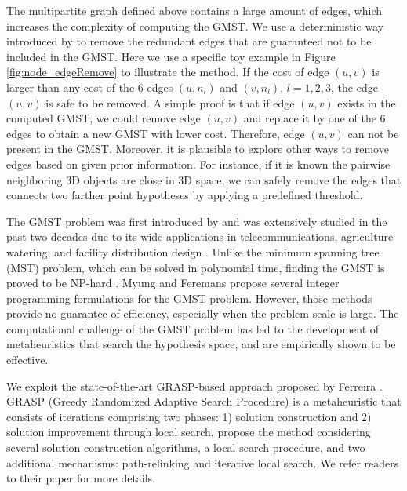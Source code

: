 The multipartite graph defined above contains a large amount of edges, which increases the complexity of computing the GMST.
We use a deterministic way introduced by \citet{Ferreira_ESWA2012} to remove the redundant edges that are guaranteed not to be included in the GMST. Here we use a specific toy example in Figure \ref{fig:node_edgeRemove} to illustrate the method. If the cost of edge $(u,v)$ is larger than any cost of the 6 edges $(u,n_l)$ and $(v,n_l)$, $l=1,2,3$, the edge $(u,v)$ is safe to be removed. A simple proof is that if edge $(u,v)$ exists in the computed GMST, we could remove edge $(u,v)$ and replace it by one of the 6 edges to obtain a new GMST with lower cost. Therefore, edge $(u,v)$ can not be present in the GMST. Moreover, it is plausible to explore other ways to remove edges based on given prior information. For instance, if it is known the pairwise neighboring 3D objects are close in 3D space, we can safely remove the edges that connects two farther point hypotheses by applying a predefined threshold.

The GMST problem was first introduced by \citet{MyungLT_95} and was extensively studied in the past two decades \cite{MyungLT_95,Dror_EJOR,Feremans_LL02,Oncan_CL08,Ferreira_ESWA2012} due to its wide applications in  telecommunications, agriculture watering, and facility distribution design \cite{MyungLT_95,Dror_EJOR}. Unlike the minimum spanning tree (MST) problem, which can be solved in polynomial time, finding the GMST is proved to be NP-hard \cite{MyungLT_95}. Myung \etal \cite{MyungLT_95} and Feremans \etal \cite{Feremans_LL02} propose several integer programming formulations for the GMST problem. However, those methods provide no guarantee of efficiency, especially when the problem scale is large. The computational challenge of the GMST problem has led to the development of metaheuristics \cite{Oncan_CL08,Ferreira_ESWA2012} that search the hypothesis space, and are empirically shown to be effective.

We exploit the state-of-the-art GRASP-based approach proposed by Ferreira \etal \cite{Ferreira_ESWA2012}. GRASP (Greedy Randomized Adaptive Search Procedure) is a metaheuristic that consists of iterations comprising two phases: 1) solution construction and 2) solution improvement through local search. \citet{Ferreira_ESWA2012} propose the method considering several solution construction algorithms, a local search procedure, and two additional mechanisms: path-relinking and iterative local search. We refer readers to their paper \cite{Ferreira_ESWA2012} for more details.

